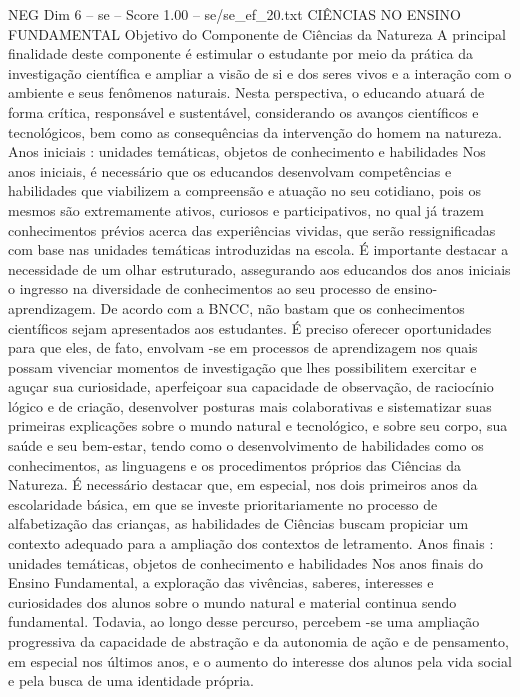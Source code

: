\begin{textsample}{NEG Dim 6 – se – Score 1.00 – se/se\_ef\_20.txt}  \label{ex:f6_neg_245}
CIÊNCIAS NO ENSINO FUNDAMENTAL Objetivo do Componente de Ciências da Natureza A principal finalidade deste componente é estimular o estudante por meio da prática da investigação científica e ampliar a visão de si e dos seres vivos e a interação com o ambiente e seus fenômenos naturais.
Nesta perspectiva, o educando atuará de forma crítica, responsável e sustentável, considerando os avanços científicos e tecnológicos, bem como as consequências da intervenção do homem na natureza.
Anos iniciais : unidades temáticas, objetos de conhecimento e habilidades Nos anos iniciais, é necessário que os educandos desenvolvam competências e habilidades que viabilizem a compreensão e atuação no seu cotidiano, pois os mesmos são extremamente ativos, curiosos e participativos, no qual já trazem conhecimentos prévios acerca das experiências vividas, que serão ressignificadas com base nas unidades temáticas introduzidas na escola.
É importante destacar a necessidade de um olhar estruturado, assegurando aos educandos dos anos iniciais o ingresso na diversidade de conhecimentos ao seu processo de ensino-aprendizagem.
De acordo com a BNCC, não bastam que os conhecimentos científicos sejam apresentados aos estudantes.
É preciso oferecer oportunidades para que eles, de fato, envolvam -se em processos de aprendizagem nos quais possam vivenciar momentos de investigação que lhes possibilitem exercitar e aguçar sua curiosidade, aperfeiçoar sua capacidade de observação, de raciocínio lógico e de criação, desenvolver posturas mais colaborativas e sistematizar suas primeiras explicações sobre o mundo natural e tecnológico, e sobre seu corpo, sua saúde e seu bem-estar, tendo como o desenvolvimento de habilidades como os conhecimentos, as linguagens e os procedimentos próprios das Ciências da Natureza.
É necessário destacar que, em especial, nos dois primeiros anos da escolaridade básica, em que se investe prioritariamente no processo de alfabetização das crianças, as habilidades de Ciências buscam propiciar um contexto adequado para a ampliação dos contextos de letramento.
Anos finais : unidades temáticas, objetos de conhecimento e habilidades Nos anos finais do Ensino Fundamental, a exploração das vivências, saberes, interesses e curiosidades dos alunos sobre o mundo natural e material continua sendo fundamental.
Todavia, ao longo desse percurso, percebem -se uma ampliação progressiva da capacidade de abstração e da autonomia de ação e de pensamento, em especial nos últimos anos, e o aumento do interesse dos alunos pela vida social e pela busca de uma identidade própria.

\end{textsample}
